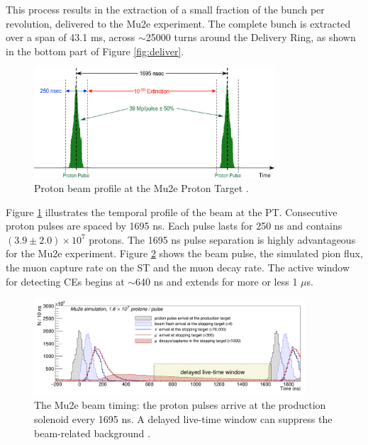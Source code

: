 This process results in the extraction of a small fraction of the bunch per revolution, 
delivered to the Mu2e experiment. The complete bunch is extracted over a span of 43.1 ms, 
across $\sim$25000 turns around the Delivery Ring, as shown in the bottom part of Figure \ref{fig:deliver}.
\begin{figure}[!h]
\centering
\includegraphics[width =0.8\textwidth]{figures/png/Screenshot_20240301_151148.png}
\caption[Proton beam profile.]{Proton beam profile at the Mu2e Proton Target \cite{accelerator}.}
\label{fig:beamprofile}
\end{figure}
Figure \ref{fig:beamprofile} illustrates the temporal 
profile of the beam at the PT. Consecutive 
proton pulses are spaced by 1695 ns. Each pulse lasts for 
250 ns and contains $(3.9 \pm 2.0 )\times 10^7$ protons. 
The 1695 ns pulse separation is highly advantageous for 
the Mu2e experiment. Figure \ref{fig:beamwindow} shows the beam pulse, 
the simulated pion flux, the muon capture rate on the ST 
and the muon decay rate. The active window for detecting 
CEs begins at $\sim$640 ns and extends for more or less 1 
$\mu$s. 

\begin{figure}[!h]
\centering
\includegraphics[width =0.9\textwidth]{figures/png/Screenshot_20240301_164649.png}
\caption[The Mu2e beam timing]{The Mu2e beam timing: the proton pulses arrive at the production solenoid every 1695 ns. A delayed live-time window can suppress the beam-related background \cite{universe9010054}.}
\label{fig:beamwindow}
\end{figure}
